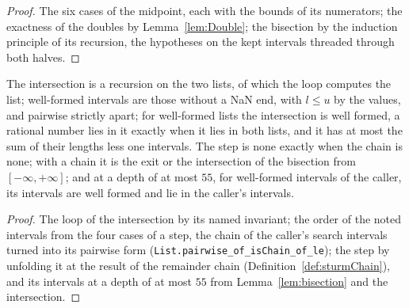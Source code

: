 \begin{proof}\leanok
  The six cases of the midpoint, each with the bounds of its numerators; the exactness of the
  doubles by Lemma~\ref{lem:Double}; the bisection by the induction principle of its recursion, the
  hypotheses on the kept intervals threaded through both halves.
\end{proof}

\begin{lemma}\label{lem:intersect}
  \leanok
  The intersection is a recursion on the two lists, of which the loop computes the list; well-formed
  intervals are those without a NaN end, with $l \le u$ by the values, and pairwise strictly apart;
  for well-formed lists the intersection is well formed, a rational number lies in it exactly when
  it lies in both lists, and it has at most the sum of their lengths less one intervals. The step is
  none exactly when the chain is none; with a chain it is the exit or the intersection of the
  bisection from $[-\infty, +\infty]$; and at a depth of at most $55$, for well-formed intervals of
  the caller, its intervals are well formed and lie in the caller's intervals.
\end{lemma}

\begin{proof}\leanok
  The loop of the intersection by its named invariant; the order of the noted intervals from the
  four cases of a step, the chain of the caller's search intervals turned into its pairwise form
  (\verb|List.pairwise_of_isChain_of_le|); the step by unfolding it at the result of the remainder
  chain (Definition~\ref{def:sturmChain}), and its intervals at a depth of at most $55$ from
  Lemma~\ref{lem:bisection} and the intersection.
\end{proof}

